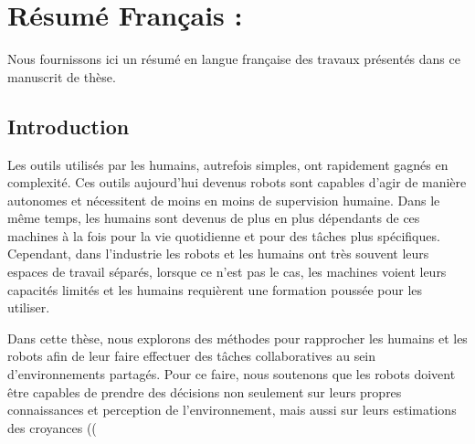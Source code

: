 \chapter{Résumé Français : }
\label{annex:frenchversion}
Nous fournissons ici un résumé en langue française des travaux présentés dans ce manuscrit de thèse.

\section{Introduction}
Les outils utilisés par les humains, autrefois simples, ont rapidement gagnés en complexité. Ces outils aujourd'hui devenus robots sont capables d'agir de manière autonomes et nécessitent de moins en moins de supervision humaine. Dans le même temps, les humains sont devenus de plus en plus dépendants de ces machines à la fois pour la vie quotidienne et pour des tâches plus spécifiques. Cependant, dans l'industrie les robots et les humains ont très souvent leurs espaces de travail séparés, lorsque ce n'est pas le cas, les machines voient leurs capacités limités et les humains requièrent une formation poussée pour les utiliser.

Dans cette thèse, nous explorons des méthodes pour rapprocher les humains et les robots afin de leur faire effectuer des tâches collaboratives au sein d’environnements partagés. Pour ce faire, nous soutenons que les robots doivent être capables de prendre des décisions non seulement sur leurs propres connaissances et perception de l’environnement, mais aussi sur leurs estimations des croyances ((



